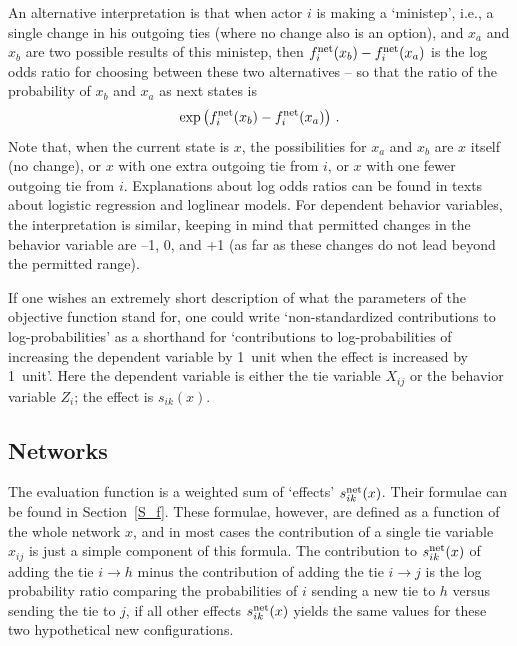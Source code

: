 \documentclass[a4paper,fleqn,11pt]{article}
\newcommand{\+}{\, + \,}
\begin{document}
An alternative interpretation is that when actor $i$ is making
a `ministep', i.e., a single change in his outgoing ties
(where no change also is an option), and
$x_a$ and $x_b$ are two possible results of this ministep,
then $f^{\rm net}_i(x_b) - f^{\rm net}_i(x_a)$ is the log odds ratio
for choosing between these two alternatives -- so that the ratio
of the probability of $x_b$ and $x_a$ as next states is
\[
  \exp\big(f^{\rm net}_i(x_b) - f^{\rm net}_i(x_a)\big) \ .
\]
Note that, when the current state is $x$, the possibilities
for $x_a$ and $x_b$ are $x$ itself (no change), or $x$ with one extra
outgoing tie from $i$, or $x$ with one fewer outgoing tie from $i$.
Explanations about log odds ratios can be found
in texts about logistic regression and loglinear models.
For dependent behavior variables, the interpretation is similar,
keeping in mind that permitted changes in the behavior variable are
--1, 0, and +1 (as far as these changes do not lead beyond the
permitted range).

If one wishes an extremely short description of what the parameters
of the objective function stand for, one could write
`non-standardized contributions to log-probabilities'
as a shorthand for
`contributions to log-probabilities of increasing the
dependent variable by 1~unit when the effect is increased by 1~unit'.
Here the dependent variable is either the tie variable $X_{ij}$
or the behavior variable $Z_i$; the effect is $s_{ik}(x)$.



\subsection{Networks}

The evaluation function is a weighted sum of `effects'
$s^{\rm net}_{ik}(x)$.
Their formulae can be found in Section~\ref{S_f}.
These formulae, however, are defined as a function of the whole
network $x$, and in most cases the contribution of a single tie
variable $x_{ij}$ is just a simple component of this formula.
The contribution to $s^{\rm net}_{ik}(x)$
of adding the tie $i \rightarrow h$ minus the
contribution of adding the tie $i \rightarrow j$ is the log probability ratio
comparing the probabilities of $i$ sending a new tie to $h$ versus
sending the tie to $j$, if all other effects $s^{\rm net}_{ik}(x)$
yields the same values for these two hypothetical new configurations.
\end{document}
